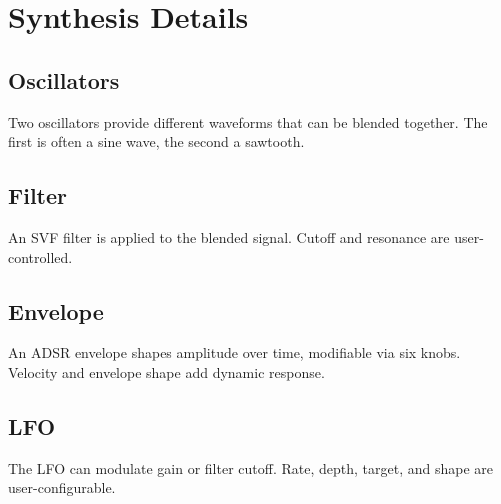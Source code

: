 \section{Synthesis Details}

\subsection{Oscillators}
Two oscillators provide different waveforms that can be blended together. The first is often a sine wave, the second a sawtooth.

\subsection{Filter}
An SVF filter is applied to the blended signal. Cutoff and resonance are user-controlled.

\subsection{Envelope}
An ADSR envelope shapes amplitude over time, modifiable via six knobs. Velocity and envelope shape add dynamic response.

\subsection{LFO}
The LFO can modulate gain or filter cutoff. Rate, depth, target, and shape are user-configurable.
